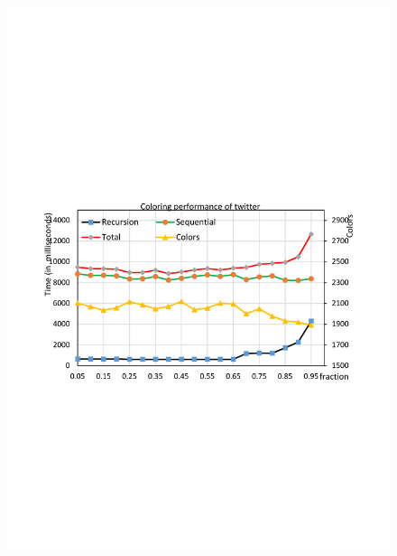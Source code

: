 \begin{figure}[t]
{		\includegraphics[scale=0.2]{figure/exp/twitter.pdf}
	}%
	\subfloat[Webbase]{
		\label{fig:webbase}
}
\end{figure}
